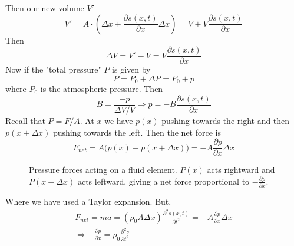 \documentclass{report}
\numberwithin{equation}{section}
\newcommand{\pd}[2]{\frac{\partial #1}{\partial #2}}
\newcommand{\pdd}[2]{\frac{\partial^2 #1}{\partial #2^2}}
\begin{document}
Then our new volume $V'$
\begin{equation}
	V' = A\cdot\left(\Delta x + \pd{s(x,t)}{x}\Delta x\right) = V + V\pd{s(x,t)}{x}
\end{equation}
Then
\begin{equation}
	\Delta V = V' - V = V\pd{s(x,t)}{x}
\end{equation}
Now if the "total pressure" $P$ is given by
\begin{equation}
	P = P_0 + \Delta P = P_0 + p
\end{equation}
where $P_0$ is the atmospheric pressure. Then
\begin{equation}
	B = \frac{-p}{\Delta V/V} \Rightarrow p = -B\pd{s(x,t)}{x}
\end{equation}
Recall that $P = F/A$. At $x$ we have $p(x)$ pushing towards the right and then $p(x+\Delta x)$ pushing towards the left. Then the net force is
\begin{equation}
	F_{net} = A\big(p(x) - p(x+\Delta x)\big) = -A\frac{\partial p}{\partial x}\Delta x
\end{equation}
\begin{figure}[H]
\centering
{}
\caption{Pressure forces acting on a fluid element. $P(x)$ acts rightward and
$P(x+\Delta x)$ acts leftward, giving a net force proportional to $-\pd{p}{x}$.}
\end{figure}
Where we have used a Taylor expansion. But,
\begin{align*}
	F_{net} = ma = (\rho_0 A \Delta x)\pdd{s(x,t)}{t} = -A\frac{\partial p}{\partial x}\Delta x\\
	\Rightarrow	-\pd{p}{x} = \rho_0\pdd{s}{t}
\end{align*}
\end{document}
